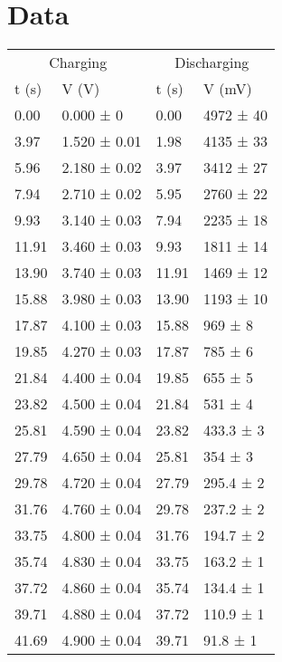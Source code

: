 \documentclass{report}
\begin{document}
\section*{Data}
\begin{table}[]
	\begin{tabular}{@{}ll|ll@{}}
		\toprule
		\multicolumn{2}{c|}{Charging} & \multicolumn{2}{c}{Discharging} \\
		t (s)  & V (V)        & t (s)        & V (mV)           \\ \midrule
		0.00   & 0.000 ± 0    & 0.00         & 4972 ± 40        \\
		3.97   & 1.520 ± 0.01 & 1.98         & 4135 ± 33        \\
		5.96   & 2.180 ± 0.02 & 3.97         & 3412 ± 27        \\
		7.94   & 2.710 ± 0.02 & 5.95         & 2760 ± 22        \\
		9.93   & 3.140 ± 0.03 & 7.94         & 2235 ± 18        \\
		11.91  & 3.460 ± 0.03 & 9.93         & 1811 ± 14        \\
		13.90  & 3.740 ± 0.03 & 11.91        & 1469 ± 12        \\
		15.88  & 3.980 ± 0.03 & 13.90        & 1193 ± 10        \\
		17.87  & 4.100 ± 0.03 & 15.88        & 969 ± 8          \\
		19.85  & 4.270 ± 0.03 & 17.87        & 785 ± 6          \\
		21.84  & 4.400 ± 0.04 & 19.85        & 655 ± 5          \\
		23.82  & 4.500 ± 0.04 & 21.84        & 531 ± 4          \\
		25.81  & 4.590 ± 0.04 & 23.82        & 433.3 ± 3        \\
		27.79  & 4.650 ± 0.04 & 25.81        & 354 ± 3          \\
		29.78  & 4.720 ± 0.04 & 27.79        & 295.4 ± 2        \\
		31.76  & 4.760 ± 0.04 & 29.78        & 237.2 ± 2        \\
		33.75  & 4.800 ± 0.04 & 31.76        & 194.7 ± 2        \\
		35.74  & 4.830 ± 0.04 & 33.75        & 163.2 ± 1        \\
		37.72  & 4.860 ± 0.04 & 35.74        & 134.4 ± 1        \\
		39.71  & 4.880 ± 0.04 & 37.72        & 110.9 ± 1        \\
		41.69  & 4.900 ± 0.04 & 39.71        & 91.8 ± 1         \\

\end{tabular}
\end{table}
\end{document}
